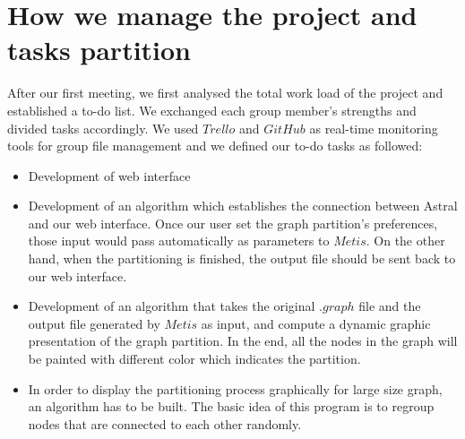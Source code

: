 \documentclass{cranfieldChart}
\begin{document}
\section{How we manage the project and tasks partition}
After our first meeting, we first analysed the total work load of the project and established a to-do list. We exchanged each group member's strengths and divided tasks accordingly. We used $Trello$ and $GitHub$ as real-time monitoring tools for group file management and we defined our to-do tasks as followed: \\
\begin{itemize}
    \item Development of web interface 
    \item Development of an algorithm which establishes the connection between Astral and our web interface. Once our user set the graph partition's preferences, those input would pass automatically as parameters to $Metis$. On the other hand, when the partitioning is finished, the output file should be sent back to our web interface. 
     \item Development of an algorithm that takes the original $.graph$ file and the output file generated by $Metis$ as input, and compute a dynamic graphic presentation of the graph partition. In the end, all the nodes in the graph will be painted with different color which indicates the partition. 
     \item In order to display the partitioning process graphically for large size graph, an algorithm has to be built. The basic idea of this program is to regroup nodes that are connected to each other randomly.   
\end{itemize}
\end{document}
